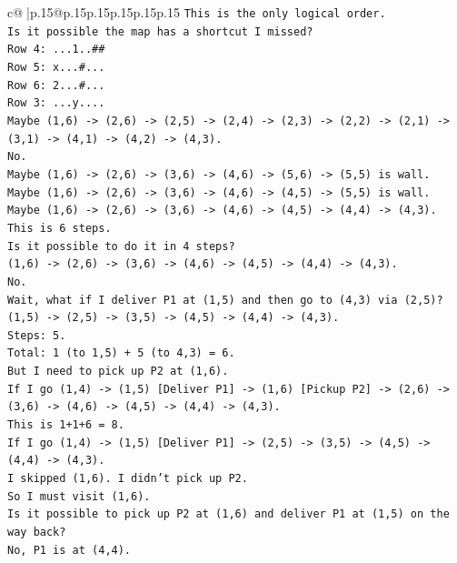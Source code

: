 \documentclass{article}
\begin{document}
{\begin{supertabular}{c@{$\;$}|p{.15\linewidth}@{}p{.15\linewidth}p{.15\linewidth}p{.15\linewidth}p{.15\linewidth}p{.15\linewidth}}
{{{\texttt{This is the only logical order.} \\
\texttt{Is it possible the map has a shortcut I missed?} \\
\texttt{Row 4: ...1..\#\#} \\
\texttt{Row 5: x...\#...} \\
\texttt{Row 6: 2...\#...} \\
\texttt{Row 3: ...y....} \\
\texttt{Maybe (1,6) {-}> (2,6) {-}> (2,5) {-}> (2,4) {-}> (2,3) {-}> (2,2) {-}> (2,1) {-}> (3,1) {-}> (4,1) {-}> (4,2) {-}> (4,3).} \\
\texttt{No.} \\
\texttt{Maybe (1,6) {-}> (2,6) {-}> (3,6) {-}> (4,6) {-}> (5,6) {-}> (5,5) is wall.} \\
\texttt{Maybe (1,6) {-}> (2,6) {-}> (3,6) {-}> (4,6) {-}> (4,5) {-}> (5,5) is wall.} \\
\texttt{Maybe (1,6) {-}> (2,6) {-}> (3,6) {-}> (4,6) {-}> (4,5) {-}> (4,4) {-}> (4,3).} \\
\texttt{This is 6 steps.} \\
\texttt{Is it possible to do it in 4 steps?} \\
\texttt{(1,6) {-}> (2,6) {-}> (3,6) {-}> (4,6) {-}> (4,5) {-}> (4,4) {-}> (4,3).} \\
\texttt{No.} \\
\texttt{Wait, what if I deliver P1 at (1,5) and then go to (4,3) via (2,5)?} \\
\texttt{(1,5) {-}> (2,5) {-}> (3,5) {-}> (4,5) {-}> (4,4) {-}> (4,3).} \\
\texttt{Steps: 5.} \\
\texttt{Total: 1 (to 1,5) + 5 (to 4,3) = 6.} \\
\texttt{But I need to pick up P2 at (1,6).} \\
\texttt{If I go (1,4) {-}> (1,5) {[}Deliver P1{]} {-}> (1,6) {[}Pickup P2{]} {-}> (2,6) {-}> (3,6) {-}> (4,6) {-}> (4,5) {-}> (4,4) {-}> (4,3).} \\
\texttt{This is 1+1+6 = 8.} \\
\texttt{If I go (1,4) {-}> (1,5) {[}Deliver P1{]} {-}> (2,5) {-}> (3,5) {-}> (4,5) {-}> (4,4) {-}> (4,3).} \\
\texttt{I skipped (1,6). I didn't pick up P2.} \\
\texttt{So I must visit (1,6).} \\
\texttt{Is it possible to pick up P2 at (1,6) and deliver P1 at (1,5) on the way back?} \\
\texttt{No, P1 is at (4,4).} \\
}}}
\end{supertabular}}
\end{document}
